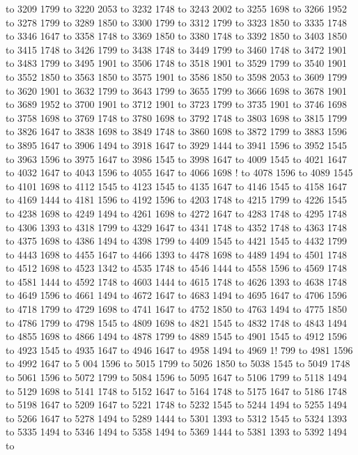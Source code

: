  to 3209 1799 to 3220 2053 to 3232 1748 to 3243 2002 to 3255 1698 to 3266 1952 to 3278 1799 to 3289 1850 to 3300 1799 to 3312 1799 to 3323 1850 to 3335 1748 to 3346 1647 to 3358 1748 to 3369 1850 to 3380 1748 to 3392 1850 to 3403 1850 to 3415 1748 to 3426 1799 to 3438 1748 to 3449 1799 to 3460 1748 to 3472 1901 to 3483 1799 to 3495 1901 to 3506 1748 to 3518 1901 to 3529 1799 to 3540 1901 to 3552 1850 to 3563 1850 to 3575 1901 to 3586 1850 to 3598 2053 to 3609 1799 to 3620 1901 to 3632 1799 to 3643 1799 to 3655 1799 to 3666 1698 to 3678 1901 to 3689 1952 to 3700 1901 to 3712 1901 to 3723 1799 to 3735 1901 to 3746 1698 to 3758 1698 to 3769 1748 to 3780 1698 to 3792 1748 to 3803 1698 to 3815 1799 to 3826 1647 to 3838 1698 to 3849 1748 to 3860 1698 to 3872 1799 to 3883 1596 to 3895 1647 to 3906 1494 to 3918 1647 to 3929 1444 to 3941 1596 to 3952 1545 to 3963 1596 to 3975 1647 to 3986 1545 to 3998 1647 to 4009 1545 to 4021 1647 to 4032 1647 to 4043 1596 to 4055 1647 to 4066 1698 !
to 4078 1596 to 4089 1545 to 4101 
1698 to 4112 1545 to 4123 1545 to 4135 1647 to 4146 1545 to 4158 1647 to 4169 1444 to 4181 1596 to 4192 1596 to 4203 1748 to 4215 1799 to 4226 1545 to 4238 1698 to 4249 1494 to 4261 1698 to 4272 1647 to 4283 1748 to 4295 1748 to 4306 1393 to 4318 1799 to 4329 1647 to 4341 1748 to 4352 1748 to 4363 1748 to 4375 1698 to 4386 1494 to 4398 1799 to 4409 1545 to 4421 1545 to 4432 1799 to 4443 1698 to 4455 1647 to 4466 1393 to 4478 1698 to 4489 1494 to 4501 1748 to 4512 1698 to 4523 1342 to 4535 1748 to 4546 1444 to 4558 1596 to 4569 1748 to 4581 1444 to 4592 1748 to 4603 1444 to 4615 1748 to 4626 1393 to 4638 1748 to 4649 1596 to 4661 1494 to 4672 1647 to 4683 1494 to 4695 1647 to 4706 1596 to 4718 1799 to 4729 1698 to 4741 1647 to 4752 1850 to 4763 1494 to 4775 1850 to 4786 1799 to 4798 1545 to 4809 1698 to 4821 1545 to 4832 1748 to 4843 1494 to 4855 1698 to 4866 1494 to 4878 1799 to 4889 1545 to 4901 1545 to 4912 1596 to 4923 1545 to 4935 1647 to 4946 1647 to 4958 1494 to 4969 1!
799 to 4981 1596 to 4992 1647 to 5
004 1596 to 5015 1799 to 5026 1850 to 5038 1545 to 5049 1748 to 5061 1596 to 5072 1799 to 5084 1596 to 5095 1647 to 5106 1799 to 5118 1494 to 5129 1698 to 5141 1748 to 5152 1647 to 5164 1748 to 5175 1647 to 5186 1748 to 5198 1647 to 5209 1647 to 5221 1748 to 5232 1545 to 5244 1494 to 5255 1494 to 5266 1647 to 5278 1494 to 5289 1444 to 5301 1393 to 5312 1545 to 5324 1393 to 5335 1494 to 5346 1494 to 5358 1494 to 5369 1444 to 5381 1393 to 5392 1494 to
